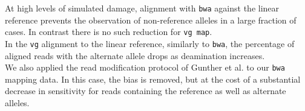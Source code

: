 \documentclass[a0paper,portrait]{baposter}
\newcommand{\vg}{{\tt vg}}
\newcommand{\bwa}{{\tt bwa}}
\begin{document}
\begin{poster}
{At high levels of simulated damage, alignment with \bwa{} against the linear reference prevents the observation of non-reference alleles in a large fraction of cases. In contrast there is no such reduction for {\tt vg map}.
\\
In the \vg{} alignment to the linear reference, similarly to \bwa{}, the percentage of aligned reads with the alternate allele drops as deamination increases.
\\
We also applied the read modification protocol of Gunther et al. to our \bwa{} mapping data. In this case, the bias is removed, but at the cost of a substantial decrease in sensitivity for reads containing the reference as well as alternate alleles.



}






\end{poster}
\end{document}
